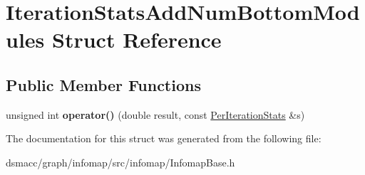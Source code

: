 \hypertarget{structIterationStatsAddNumBottomModules}{}\section{Iteration\+Stats\+Add\+Num\+Bottom\+Modules Struct Reference}
\label{structIterationStatsAddNumBottomModules}
\subsection*{Public Member Functions}
\begin{DoxyCompactItemize}
\item 
\mbox{\label{structIterationStatsAddNumBottomModules_a4696b674695840e91b48aba1890bb57d}} 
unsigned int {\bfseries operator()} (double result, const \mbox{\hyperlink{structPerIterationStats}{Per\+Iteration\+Stats}} \&s)
\end{DoxyCompactItemize}


The documentation for this struct was generated from the following file\+:\begin{DoxyCompactItemize}
\item 
dsmacc/graph/infomap/src/infomap/Infomap\+Base.\+h\end{DoxyCompactItemize}
